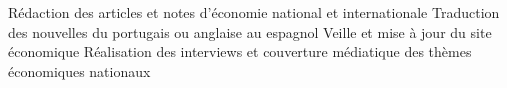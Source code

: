 \documentclass{tccv}
\begin{document}
\begin{textblock}{13}
\begin{mdframed}
\begin{eventlist}
\begin{itemize}
      \setlength\itemsep{0cm} 
      \cvitem[\checkmark] Rédaction des articles et notes d’économie national et internationale
      \cvitem[\checkmark] Traduction des nouvelles du portugais ou anglaise au espagnol
      \cvitem[\checkmark] Veille et mise à jour du site économique
      \cvitem[\checkmark] Réalisation des interviews et couverture médiatique des thèmes économiques nationaux

\end{itemize}        
\fi
   


\end{eventlist}


\end{mdframed}
\end{textblock}
\end{document}
